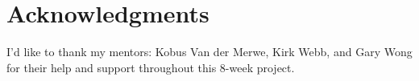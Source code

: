 

\section*{Acknowledgments}

I'd like to thank my mentors: Kobus Van der Merwe, Kirk Webb, and Gary Wong for their help and 
support throughout this 8-week project.
%
%
%
%


